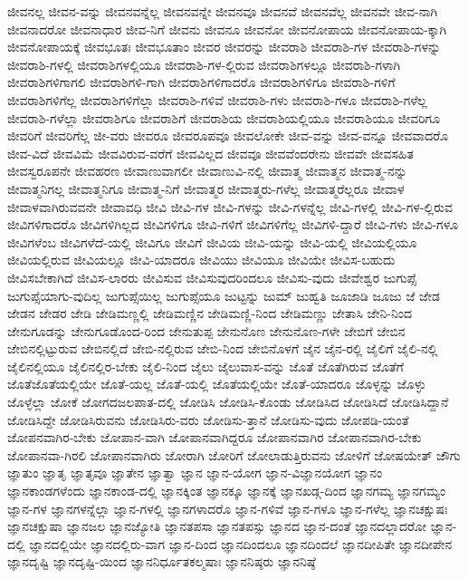 {ಜೀವನಲ್ಲ
ಜೀವನ-ವನ್ನು
ಜೀವನವನ್ನೆಲ್ಲ
ಜೀವನವನ್ನೇ
ಜೀವನವೂ
ಜೀವನವೆ
ಜೀವನವೆಲ್ಲ
ಜೀವನವೇ
ಜೀವ-ನಾಗಿ
ಜೀವನಾದರೋ
ಜೀವನಾಧಾರ
ಜೀವ-ನಿಗೆ
ಜೀವನು
ಜೀವನೂ
ಜೀವನೋ
ಜೀವನೋಪಾಯ
ಜೀವನೋಪಾಯ-ಕ್ಕಾಗಿ
ಜೀವನೋಪಾಯಕ್ಕೆ
ಜೀವಭೂತಃ
ಜೀವಭೂತಾಂ
ಜೀವರ
ಜೀವರನ್ನು
ಜೀವರಾಶಿ
ಜೀವರಾಶಿ-ಗಳ
ಜೀವರಾಶಿ-ಗಳನ್ನು
ಜೀವರಾಶಿ-ಗಳಲ್ಲಿ
ಜೀವರಾಶಿಗಳಲ್ಲಿಯೂ
ಜೀವರಾಶಿ-ಗಳ-ಲ್ಲಿರುವ
ಜೀವರಾಶಿಗಳಲ್ಲೂ
ಜೀವರಾಶಿ-ಗಳಾಗಿ
ಜೀವರಾಶಿಗಳಿಗಾಗಲಿ
ಜೀವರಾಶಿಗಳಿ-ಗಾಗಿ
ಜೀವರಾಶಿಗಳಿಗಾದರೊ
ಜೀವರಾಶಿಗಳಿಗೂ
ಜೀವರಾಶಿ-ಗಳಿಗೆ
ಜೀವರಾಶಿಗಳಿಗೆಲ್ಲ
ಜೀವರಾಶಿಗಳಿಗೆಲ್ಲಾ
ಜೀವರಾಶಿ-ಗಳಿವೆ
ಜೀವರಾಶಿ-ಗಳು
ಜೀವರಾಶಿ-ಗಳೂ
ಜೀವರಾಶಿ-ಗಳೆಲ್ಲ
ಜೀವರಾಶಿ-ಗಳೆಲ್ಲಾ
ಜೀವರಾಶಿಗೂ
ಜೀವರಾಶಿಗೆ
ಜೀವರಾಶಿಯ
ಜೀವರಾಶಿಯಲ್ಲಿಯೂ
ಜೀವರಾಶಿಯೂ
ಜೀವರಿಗೂ
ಜೀವರಿಗೆ
ಜೀವರಿಗೆಲ್ಲ
ಜೀ-ವರು
ಜೀವರೂ
ಜೀವರೂಪವೂ
ಜೀವಲೋಕೇ
ಜೀವ-ವನ್ನು
ಜೀವ-ವನ್ನೂ
ಜೀವವಾದರೊ
ಜೀವ-ವಿದೆ
ಜೀವವಿಮೆ
ಜೀವವಿರುವ-ವರೆಗೆ
ಜೀವವಿಲ್ಲದ
ಜೀವವೂ
ಜೀವವೆಂದರೇನು
ಜೀವವೇ
ಜೀವಸಹಿತ
ಜೀವಸ್ವರೂಪನೇ
ಜೀವಹರಣ
ಜೀವಾಣುವಾಗಲೀ
ಜೀವಾಣುವಿ-ನಲ್ಲಿ
ಜೀವಾತ್ಮ
ಜೀವಾತ್ಮನ
ಜೀವಾತ್ಮ-ನನ್ನು
ಜೀವಾತ್ಮನಿಗಲ್ಲ
ಜೀವಾತ್ಮನಿಗೂ
ಜೀವಾತ್ಮ-ನಿಗೆ
ಜೀವಾತ್ಮರ
ಜೀವಾತ್ಮರು-ಗಳೆಲ್ಲ
ಜೀವಾತ್ಮರೆಲ್ಲರೂ
ಜೀವಾಳ
ಜೀವಾಳವಾಗಿರುವವನೇ
ಜೀವಾವಧಿ
ಜೀವಿ
ಜೀವಿ-ಗಳ
ಜೀವಿ-ಗಳನ್ನು
ಜೀವಿ-ಗಳನ್ನೆಲ್ಲ
ಜೀವಿ-ಗಳಲ್ಲಿ
ಜೀವಿ-ಗಳ-ಲ್ಲಿರುವ
ಜೀವಿಗಳಿಗಾದರೊ
ಜೀವಿಗಳಿಗಿಲ್ಲದ
ಜೀವಿಗಳಿಗೂ
ಜೀವಿ-ಗಳಿಗೆ
ಜೀವಿಗಳಿಗೆಲ್ಲ
ಜೀವಿಗಳಿ-ದ್ದಾರೆ
ಜೀವಿ-ಗಳು
ಜೀವಿ-ಗಳೂ
ಜೀವಿಗಳೆಂಬ
ಜೀವಿಗಳೆದೆ-ಯಲ್ಲಿ
ಜೀವಿಗೂ
ಜೀವಿಗೆ
ಜೀವಿಯ
ಜೀವಿ-ಯನ್ನು
ಜೀವಿ-ಯಲ್ಲಿ
ಜೀವಿಯಲ್ಲಿಯೂ
ಜೀವಿಯಲ್ಲಿರುವ
ಜೀವಿಯಲ್ಲೂ
ಜೀವಿ-ಯಾದರೂ
ಜೀವಿಯು
ಜೀವಿಯೂ
ಜೀವಿಯೇ
ಜೀವಿಸ-ಬಹುದು
ಜೀವಿಸಬೇಕಾಗಿದೆ
ಜೀವಿಸ-ಲಾರರು
ಜೀವಿಸುವ
ಜೀವಿಸುವುದರಿಂದಲೂ
ಜೀವಿಸು-ವುದು
ಜೀವೇಶ್ವರ
ಜುಗುಪ್ಸೆ
ಜುಗುಪ್ಸೆಯಾಗು-ವುದಿಲ್ಲ
ಜುಗುಪ್ಸೆಯಿಲ್ಲ
ಜುಗುಪ್ಸೆಯೂ
ಜುಟ್ಟನ್ನು
ಜುಮ್
ಜುಹ್ವತಿ
ಜೂಜಾಡಿ
ಜೂಜು
ಜೆ
ಜೇಡ
ಜೇಡನ
ಜೇಡರ
ಜೇಡಿ
ಜೇಡಿಮಣ್ಣಲ್ಲಿ
ಜೇಡಿಮಣ್ಣಿನ
ಜೇಡಿಮಣ್ಣಿ-ನಿಂದ
ಜೇಡಿಮಣ್ಣು
ಜೇತಾಸಿ
ಜೇನಿ-ನಿಂದ
ಜೇನುಗೂಡನ್ನು
ಜೇನುಗೂಡೊಂದ-ರಿಂದ
ಜೇನುತುಪ್ಪ
ಜೇನುನೊಣ
ಜೇನುನೊಣ-ಗಳೇ
ಜೇಬಿಗೆ
ಜೇಬಿನ
ಜೇಬಿನಲ್ಲಿಟ್ಟುರುವ
ಜೇಬಿನಲ್ಲಿದೆ
ಜೇಬಿ-ನಲ್ಲಿರುವ
ಜೇಬಿ-ನಿಂದ
ಜೇಬಿನೊಳಗೆ
ಜೈನ
ಜೈನ-ರಲ್ಲಿ
ಜೈಲಿಗೆ
ಜೈಲಿ-ನಲ್ಲಿ
ಜೈಲಿನಲ್ಲಿಯೂ
ಜೈಲಿನಲ್ಲಿರ-ಬೇಕು
ಜೈಲಿ-ನಿಂದ
ಜೈಲು
ಜೈಲುವಾಸ-ವನ್ನು
ಜೊತೆ
ಜೊತೆಗಿರುವ
ಜೊತೆಗೆ
ಜೊತೆಜೊತೆಯಲ್ಲಿಯೇ
ಜೊತೆ-ಯಲ್ಲ
ಜೊತೆ-ಯಲ್ಲಿ
ಜೊತೆಯಲ್ಲಿಯೇ
ಜೊತೆ-ಯಾದರೂ
ಜೊಳ್ಳನ್ನು
ಜೊಳ್ಳು
ಜೊಳ್ಳೆಲ್ಲಾ
ಜೋಕೆ
ಜೋಗದಜಲಪಾತ-ದಲ್ಲಿ
ಜೋಡಿಸಿ
ಜೋಡಿಸಿ-ಕೊಂಡು
ಜೋಡಿಸಿದ
ಜೋಡಿಸಿದೆ
ಜೋಡಿಸಿದ್ದಾನೆ
ಜೋಡಿಸಿದ್ದೇ
ಜೋಡಿಸಿರುವನು
ಜೋಡಿಸಿರು-ವರು
ಜೋಡಿಸು-ತ್ತಾನೆ
ಜೋಡಿಸು-ವುದು
ಜೋಪಡಿ-ಯಂತೆ
ಜೋಪನವಾಗಿರ-ಬೇಕು
ಜೋಪಾನ-ವಾಗಿ
ಜೋಪಾನವಾಗಿದ್ದರೂ
ಜೋಪಾನವಾಗಿರ
ಜೋಪಾನವಾಗಿರ-ಬೇಕು
ಜೋಪಾನವಾ-ಗಿರಲಿ
ಜೋಪಾನವಾಗಿರು
ಜೋರಾಗಿ
ಜೋರಿಗೆ
ಜೋಲಾಡುತ್ತಿರುವನು
ಜೋಳಿಗೆ
ಜೋಷಯೇತ್
ಜೌಗು
ಜ್ಞಾತುಂ
ಜ್ಞಾತೃ
ಜ್ಞಾತೃವೂ
ಜ್ಞಾತೇನ
ಜ್ಞಾತ್ವಾ
ಜ್ಞಾನ
ಜ್ಞಾನ-ಯೋಗ
ಜ್ಞಾನ-ವಿಜ್ಞಾನಯೋಗ
ಜ್ಞಾನಂ
ಜ್ಞಾನಕಾಂಡಗಳೆಂದು
ಜ್ಞಾನಕಾಂಡ-ದಲ್ಲಿ
ಜ್ಞಾನಕ್ಕಿಂತ
ಜ್ಞಾನಕ್ಕೂ
ಜ್ಞಾನಕ್ಕೆ
ಜ್ಞಾನಖಡ್ಗ-ದಿಂದ
ಜ್ಞಾನಗಮ್ಯ
ಜ್ಞಾನಗಮ್ಯಂ
ಜ್ಞಾನ-ಗಳ
ಜ್ಞಾನಗಳನ್ನೆಲ್ಲಾ
ಜ್ಞಾನ-ಗಳಲ್ಲಿ
ಜ್ಞಾನಗಳಾದರೊ
ಜ್ಞಾನ-ಗಳಿವೆ
ಜ್ಞಾನ-ಗಳೂ
ಜ್ಞಾನ-ಗಳೆಲ್ಲ
ಜ್ಞಾನಚಕ್ಷುಷಃ
ಜ್ಞಾನಚಕ್ಷುಷಾ
ಜ್ಞಾನಜಲ
ಜ್ಞಾನಜ್ಯೋತಿ
ಜ್ಞಾನತಪಸಾ
ಜ್ಞಾನತಪಸ್ಸು
ಜ್ಞಾನದ
ಜ್ಞಾನ-ದಂತೆ
ಜ್ಞಾನದಲ್ಲಾದರೋ
ಜ್ಞಾನ-ದಲ್ಲಿ
ಜ್ಞಾನದಲ್ಲಿಯೇ
ಜ್ಞಾನದಲ್ಲಿರು-ವಾಗ
ಜ್ಞಾನ-ದಿಂದ
ಜ್ಞಾನದಿಂದಲೂ
ಜ್ಞಾನದಿಂದಲೆ
ಜ್ಞಾನದೀಪಿತೇ
ಜ್ಞಾನದೀಪೇನ
ಜ್ಞಾನದೃಷ್ಟಿ
ಜ್ಞಾನದೃಷ್ಟಿ-ಯಿಂದ
ಜ್ಞಾನನಿರ್ಧೂತಕಲ್ಮಷಾಃ
ಜ್ಞಾನನಿಷ್ಠರು
ಜ್ಞಾನನಿಷ್ಠೆ
}
